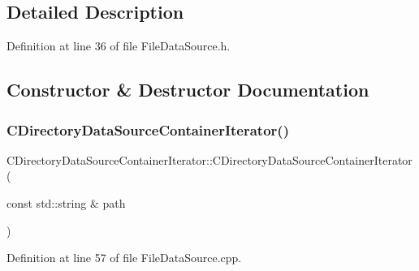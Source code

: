 \subsection{Detailed Description}


Definition at line 36 of file File\+Data\+Source.\+h.



\subsection{Constructor \& Destructor Documentation}
\hypertarget{classCDirectoryDataSourceContainerIterator_a34b3253df5cc88a08b8f3f51f7fe9768}{}\label{classCDirectoryDataSourceContainerIterator_a34b3253df5cc88a08b8f3f51f7fe9768} 
\subsubsection{\texorpdfstring{C\+Directory\+Data\+Source\+Container\+Iterator()}{CDirectoryDataSourceContainerIterator()}}
{\footnotesize\ttfamily C\+Directory\+Data\+Source\+Container\+Iterator\+::\+C\+Directory\+Data\+Source\+Container\+Iterator (\begin{DoxyParamCaption}\item[{const std\+::string \&}]{path }\end{DoxyParamCaption})\hspace{0.3cm}{\ttfamily [protected]}}



Definition at line 57 of file File\+Data\+Source.\+cpp.


